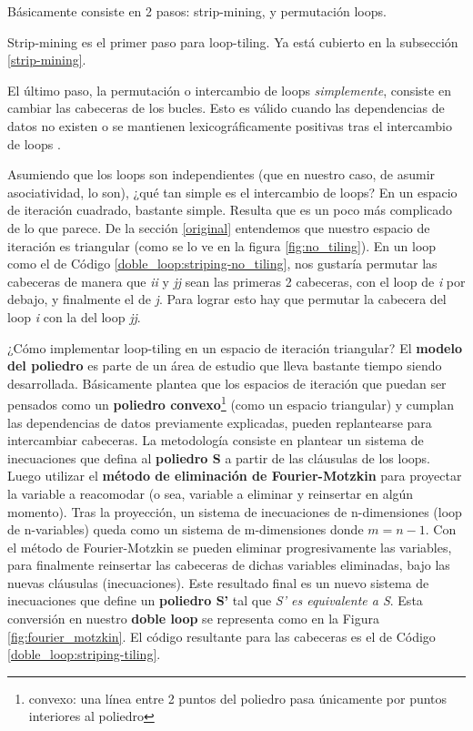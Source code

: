 \documentclass{article}
\begin{document}
Básicamente consiste en 2 pasos: strip-mining, y permutación loops.


Strip-mining es el primer paso para loop-tiling. Ya está cubierto en la subsección \ref{strip-mining}.


El último paso, la permutación o intercambio de loops \textit{simplemente}, consiste en cambiar las cabeceras de los bucles.
Esto es válido cuando las dependencias de datos no existen o se mantienen lexicográficamente positivas
tras el intercambio de loops \cite{Laforest10ece1754}.


Asumiendo que los loops son independientes (que en nuestro caso, de asumir asociatividad, lo son),
¿qué tan simple es el intercambio de loops? En un espacio de iteración cuadrado, bastante simple. Resulta
que es un poco más complicado de lo que parece. De la sección \ref{original} entendemos que
nuestro espacio de iteración es triangular (como se lo ve en la figura \ref{fig:no_tiling}).
En un loop como el de Código \ref{doble_loop:striping-no_tiling}, nos gustaría permutar las cabeceras de manera que
\textit{ii} y \textit{jj} sean las primeras 2 cabeceras, con el loop de \textit{i} por debajo, y finalmente
el de \textit{j}. Para lograr esto hay que permutar la cabecera del loop \textit{i} con la del loop \textit{jj}.


¿Cómo implementar loop-tiling en un espacio de iteración triangular? El \textbf{modelo del poliedro} es parte
de un área de estudio que lleva bastante tiempo siendo desarrollada. Básicamente plantea que los espacios
de iteración que puedan ser pensados como un \textbf{poliedro convexo}\footnote{convexo: una línea entre 2 puntos
del poliedro pasa únicamente por puntos interiores al poliedro} (como un espacio triangular) y cumplan las dependencias
de datos previamente explicadas, pueden replantearse para intercambiar cabeceras. La metodología consiste en
plantear un sistema de inecuaciones que defina al \textbf{poliedro S} a partir de las cláusulas de los loops. Luego utilizar
el \textbf{método de eliminación de Fourier-Motzkin} para proyectar la variable a reacomodar (o sea, variable a eliminar y
reinsertar en algún momento). Tras la proyección, un sistema de inecuaciones de n-dimensiones (loop de n-variables)
queda como un sistema de m-dimensiones donde $m=n-1$. Con el método de Fourier-Motzkin se pueden eliminar progresivamente las variables,
para finalmente reinsertar las cabeceras de dichas variables eliminadas, bajo las nuevas cláusulas (inecuaciones). Este resultado
final es un nuevo sistema de inecuaciones que define un \textbf{poliedro S'} tal que \textit{S' es equivalente a S}.
Esta conversión en nuestro \textbf{doble loop} se representa como en la Figura \ref{fig:fourier_motzkin}. El código
resultante para las cabeceras es el de Código \ref{doble_loop:striping-tiling}.
\end{document}
